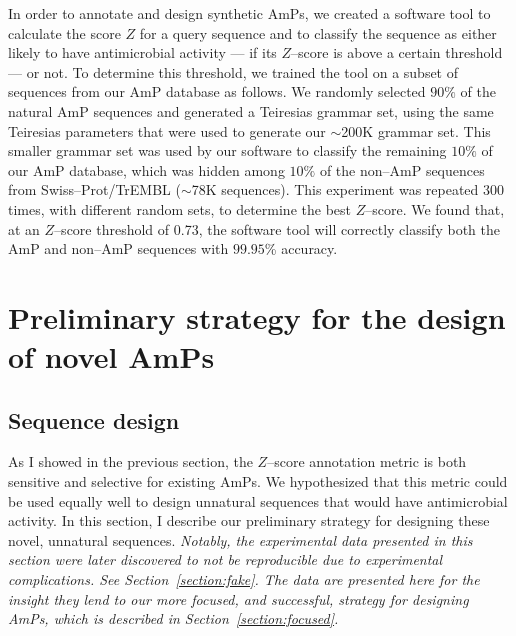     In order to annotate and design synthetic AmPs, we created a software tool to
    calculate the score $Z$ for a query sequence and to classify the
    sequence as either likely to have antimicrobial activity --- if its
    $Z$--score is above a certain threshold --- or not.  To determine
    this threshold, we trained the tool on a subset of sequences from our
    AmP database as follows.  We randomly selected $90\%$ of the natural
    AmP sequences and generated a Teiresias grammar set, using the same
    Teiresias parameters that were used to generate our $\sim$200K grammar
    set.  This smaller grammar set was used by our software to classify
    the remaining $10\%$ of our AmP database, which was hidden among
    $10\%$ of the non--AmP sequences from Swiss--Prot/TrEMBL ($\sim$78K
    sequences).  This experiment was repeated 300 times, with different
    random sets, to determine the best $Z$--score.  We found that, at
    an $Z$--score threshold of 0.73, the software tool will correctly
    classify both the AmP and non--AmP sequences with $99.95$\% accuracy.


\section{Preliminary strategy for the design of novel
AmPs}\label{section:preliminary}

    \subsection{Sequence design}
    As I showed in the previous section, the $Z$--score annotation
    metric is both sensitive and selective for existing AmPs.
    We hypothesized that this metric could be used equally well to
    design unnatural sequences that would have antimicrobial
    activity.  In this section, I describe our preliminary strategy
    for designing these novel, unnatural sequences.
    \textit{Notably, the experimental data presented
    in this section were later discovered to not be
    reproducible due to experimental complications. See
    Section~\vref{section:fake}.  The data are presented
    here for the insight they lend to our more focused,
    and successful, strategy for designing AmPs, which is
    described in Section~\vref{section:focused}.}

